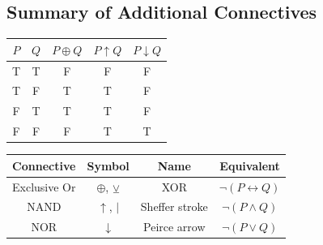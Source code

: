 \subsection{Summary of Additional Connectives}

\begin{center}
\renewcommand{\arraystretch}{1.2}
\begin{tabular}{|c|c||c|c|c|}
\hline
$P$ & $Q$ & $P \oplus Q$ & $P \uparrow Q$ & $P \downarrow Q$ \\
\hline
T & T & F & F & F \\
T & F & T & T & F \\
F & T & T & T & F \\
F & F & F & T & T \\
\hline
\end{tabular}
\end{center}

\begin{center}
\renewcommand{\arraystretch}{1.3}
\begin{tabular}{|c|c|c|c|}
\hline
\textbf{Connective} & \textbf{Symbol} & \textbf{Name} & \textbf{Equivalent} \\
\hline
Exclusive Or & $\oplus$, $\veebar$ & XOR & $\neg(P \leftrightarrow Q)$ \\
NAND & $\uparrow$, $|$ & Sheffer stroke & $\neg(P \wedge Q)$ \\
NOR & $\downarrow$ & Peirce arrow & $\neg(P \vee Q)$ \\
\hline
\end{tabular}
\end{center}

